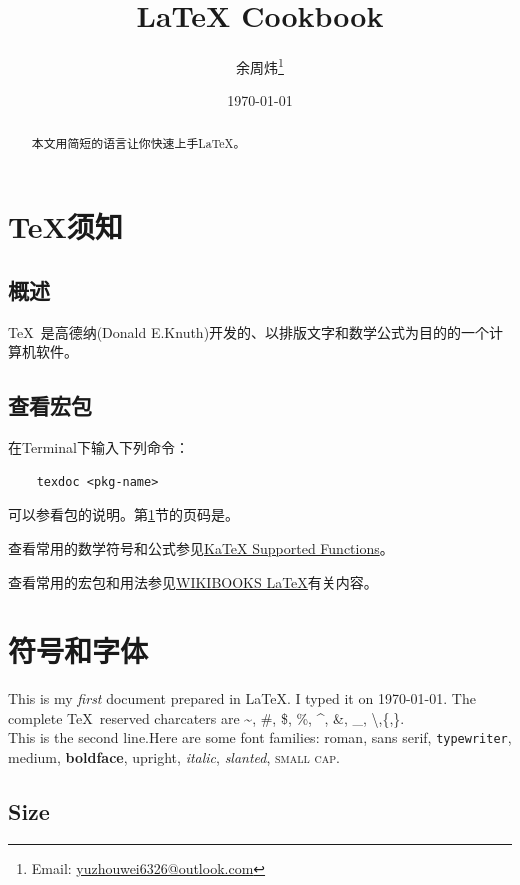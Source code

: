 \documentclass[a4paper]{article} %
\title{\heiti \LaTeX\; Cookbook}
\author{\kaishu 余周炜\thanks{Email: \href{mailto:yuzhouwei6326@outlook.com}{yuzhouwei6326@outlook.com}}}
\date{\today}
\numberwithin{equation}{section} %
\begin{document}
\maketitle

\begin{abstract}
本文用简短的语言让你快速上手LaTeX。
\end{abstract}

\clearpage
\tableofcontents

\newpage
\section{\TeX 须知}\label{sec:tex}

\subsection{概述}
\TeX\ 是高德纳(Donald E.Knuth)开发的、以排版文字和数学公式为目的的一个计算机软件。

\subsection{查看宏包}

在Terminal下输入下列命令：
\begin{lstlisting}
    texdoc <pkg-name>
\end{lstlisting}

可以参看包的说明。第\ref{sec:tex}节的页码是\pageref{sec:tex}。

查看常用的数学符号和公式参见\href{https://katex.org/docs/supported.html}{KaTeX Supported Functions}。

查看常用的宏包和用法参见\href{https://en.wikibooks.org/wiki/LaTeX}{WIKIBOOKS \LaTeX}有关内容。

\section{符号和字体}
This is my \emph{first} document prepared in \LaTeX. I typed it on \today.
The complete \TeX\ reserved charcaters are \textasciitilde, \#, \$, \%, 
\textasciicircum, \&, \_, \textbackslash,\{,\}. \\[10pt]
\noindent This is the second line.Here are some font families:
\textrm{roman}, \textsf{sans serif}, \texttt{typewriter}, \textmd{medium}, 
\textbf{boldface}, \textup{upright}, \textit{italic}, \textsl{slanted}, 
\textsc{small cap}.
\subsection{Size}\label{sub:size}
\end{document}
